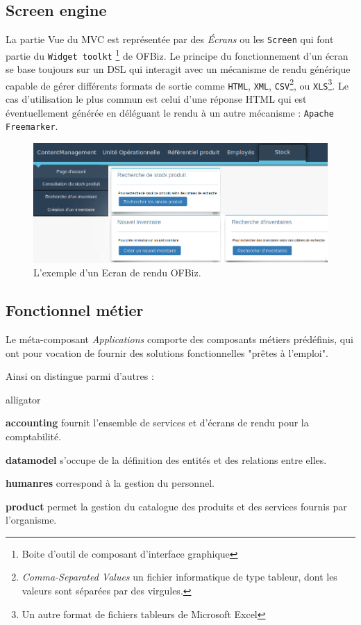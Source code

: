 \subsection{Screen engine}
La partie Vue du MVC est représentée par des \emph{Écrans} ou les \verb|Screen| qui font partie du \verb|Widget toolkt| \footnote{Boite d'outil de composant d'interface graphique} de OFBiz. Le principe du fonctionnement d'un écran se base toujours sur un DSL qui interagit avec un mécanisme de rendu générique capable de gérer différents formats de sortie comme \verb|HTML|, \verb|XML|, \verb|CSV|\footnote{\emph{Comma-Separated Values}  un fichier informatique de type tableur, dont les valeurs sont séparées par des virgules. }, ou \verb|XLS|\footnote{ Un autre format de fichiers tableurs de Microsoft Excel}. Le cas d'utilisation le plus commun est celui d'une réponse HTML qui est éventuellement générée en déléguant le rendu à un autre mécanisme : \verb|Apache Freemarker|.
\begin{figure}[h!]
	\includegraphics[width=\linewidth]{screenOfbiZ.png}
	\caption{L'exemple d'un Ecran de rendu OFBiz.}
	\label{fig:screen}
\end{figure}

\subsection{Fonctionnel métier}
Le méta-composant \emph{Applications} comporte des composants métiers prédéfinis, qui ont pour vocation de fournir des solutions fonctionnelles "prêtes à l'emploi". 

Ainsi on distingue parmi d'autres :
\begin{labeling}{alligator}
	\item [\textbf{accounting}] fournit l'ensemble de services et d'écrans de rendu pour la comptabilité.
	\item [\textbf{datamodel}] s'occupe de la définition des entités et des relations entre elles.
	\item [\textbf{humanres}] correspond à la gestion du personnel.
	\item [\textbf{product}] permet la gestion du catalogue des produits et des services fournis par l'organisme.
\end{labeling}


